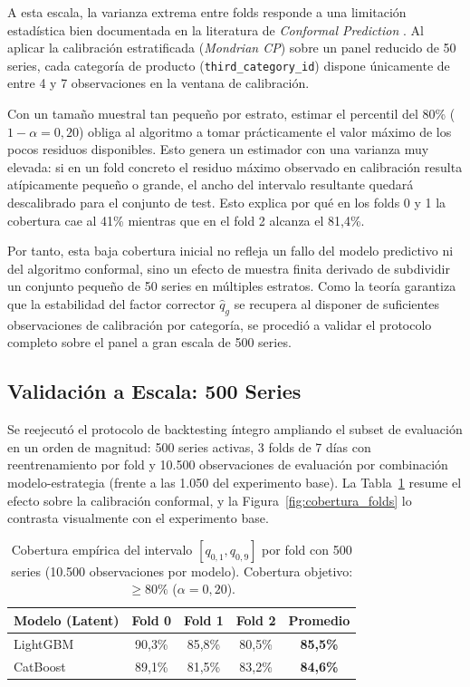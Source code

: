 A esta escala, la varianza extrema entre folds responde a una limitación estadística bien documentada en la literatura de \textit{Conformal Prediction} \cite{angelopoulos2021gentle,vovk2005algorithmic}. Al aplicar la calibración estratificada (\textit{Mondrian CP}) sobre un panel reducido de 50 series, cada categoría de producto (\texttt{third\_category\_id}) dispone únicamente de entre 4 y 7 observaciones en la ventana de calibración.

Con un tamaño muestral tan pequeño por estrato, estimar el percentil del 80\% ($1-\alpha = 0{,}20$) obliga al algoritmo a tomar prácticamente el valor máximo de los pocos residuos disponibles. Esto genera un estimador con una varianza muy elevada: si en un fold concreto el residuo máximo observado en calibración resulta atípicamente pequeño o grande, el ancho del intervalo resultante quedará descalibrado para el conjunto de test. Esto explica por qué en los folds 0 y 1 la cobertura cae al 41\% mientras que en el fold 2 alcanza el 81,4\%.

Por tanto, esta baja cobertura inicial no refleja un fallo del modelo predictivo ni del algoritmo conformal, sino un efecto de muestra finita derivado de subdividir un conjunto pequeño de 50 series en múltiples estratos. Como la teoría garantiza que la estabilidad del factor corrector $\hat{q}_g$ se recupera al disponer de suficientes observaciones de calibración por categoría, se procedió a validar el protocolo completo sobre el panel a gran escala de 500 series.

\subsection{Validación a Escala: 500 Series}
\label{sec:resultados_escala}

Se reejecutó el protocolo de backtesting íntegro ampliando el subset de evaluación en un orden de magnitud: 500 series activas, 3 folds de 7 días con reentrenamiento por fold y 10.500 observaciones de evaluación por combinación modelo-estrategia (frente a las 1.050 del experimento base). La Tabla~\ref{tab:scale_coverage} resume el efecto sobre la calibración conformal, y la Figura~\ref{fig:cobertura_folds} lo contrasta visualmente con el experimento base.

\begin{table}[htbp]
    \centering
    \small
    \begin{tabular}{lcccc}
        \toprule
        \textbf{Modelo (Latent)} & \textbf{Fold 0} & \textbf{Fold 1} & \textbf{Fold 2} & \textbf{Promedio} \\
        \midrule
        LightGBM  & 90{,}3\% & 85{,}8\% & 80{,}5\% & \textbf{85{,}5\%} \\
        CatBoost  & 89{,}1\% & 81{,}5\% & 83{,}2\% & \textbf{84{,}6\%} \\
        \bottomrule
    \end{tabular}
    \caption[Cobertura conformal por fold a 500 series]{Cobertura empírica del intervalo $[q_{0{,}1}, q_{0{,}9}]$ por fold con 500 series (10.500 observaciones por modelo). Cobertura objetivo: $\geq 80\%$ ($\alpha = 0{,}20$).}
    \label{tab:scale_coverage}
\end{table}

